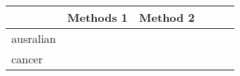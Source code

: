 \begin{tabular}{ l C{\tblw} C{\tblw} C{\tblw} C{\tblw} C{\tblw} }
\toprule
  & Methods 1 & Method 2 \\
\midrule
\sc ausralian &  \\
\sc cancer &  \\
\bottomrule 
\end{tabular}